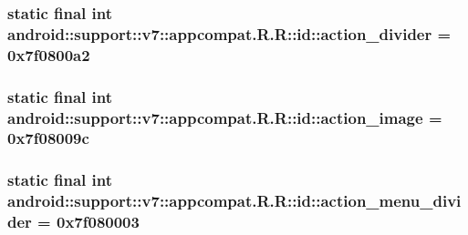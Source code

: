 \hypertarget{classandroid_1_1support_1_1v7_1_1appcompat_1_1_r_1_1id_8601bc1c0e5bbef300221dd1cb8a88d1}{
\subsubsection[{action\_\-divider}]{\setlength{\rightskip}{0pt plus 5cm}static final int android::support::v7::appcompat.R.R::id::action\_\-divider = 0x7f0800a2}}
\label{classandroid_1_1support_1_1v7_1_1appcompat_1_1_r_1_1id_8601bc1c0e5bbef300221dd1cb8a88d1}


\hypertarget{classandroid_1_1support_1_1v7_1_1appcompat_1_1_r_1_1id_343cfc515ef9b017d716fdb91cfe9cff}{
\subsubsection[{action\_\-image}]{\setlength{\rightskip}{0pt plus 5cm}static final int android::support::v7::appcompat.R.R::id::action\_\-image = 0x7f08009c}}
\label{classandroid_1_1support_1_1v7_1_1appcompat_1_1_r_1_1id_343cfc515ef9b017d716fdb91cfe9cff}


\hypertarget{classandroid_1_1support_1_1v7_1_1appcompat_1_1_r_1_1id_a2a0fea4d86cb99c3f12e41cabe514d7}{
\subsubsection[{action\_\-menu\_\-divider}]{\setlength{\rightskip}{0pt plus 5cm}static final int android::support::v7::appcompat.R.R::id::action\_\-menu\_\-divider = 0x7f080003}}
\label{classandroid_1_1support_1_1v7_1_1appcompat_1_1_r_1_1id_a2a0fea4d86cb99c3f12e41cabe514d7}


